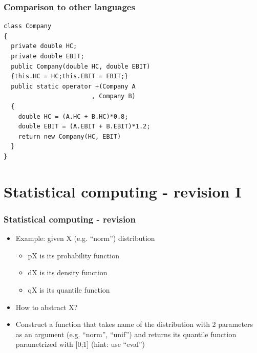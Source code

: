 \documentclass[bigger]{beamer}
\begin{document}
\begin{frame}[fragile]
\frametitle{Comparison to other languages}
\label{sec-5-7}


\begin{verbatim}
class Company
{
  private double HC;
  private double EBIT;
  public Company(double HC, double EBIT)
  {this.HC = HC;this.EBIT = EBIT;}
  public static operator +(Company A
                        , Company B)
  {
    double HC = (A.HC + B.HC)*0.8;
    double EBIT = (A.EBIT + B.EBIT)*1.2;
    return new Company(HC, EBIT)
  }
}
\end{verbatim}
\end{frame}
\section{Statistical computing - revision I}
\label{sec-6}
\begin{frame}
\frametitle{Statistical computing - revision}
\label{sec-6-1}
\begin{itemize}

\item Example: given X (e.g. ``norm'') distribution
\label{sec-6-1-1}%
\begin{itemize}

\item pX is its probability function
\label{sec-6-1-1-1}%

\item dX is its density function
\label{sec-6-1-1-2}%

\item qX is its quantile function
\label{sec-6-1-1-3}%
\end{itemize} %

\item How to abstract X?
\label{sec-6-1-2}%

\item Construct a function that takes name of the distribution with 2 parameters as an argument (e.g. ``norm'', ``unif'') and returns its quantile function parametrized with [0;1] (hint: use ``eval'')
\label{sec-6-1-3}%
\end{itemize} %
\end{frame}
\end{document}
